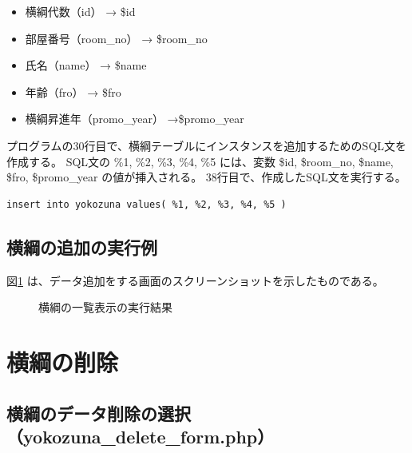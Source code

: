 \documentclass[10pt,a4paper,titlepage]{jreport}
\begin{document}


\begin{itemize}
\item 横綱代数（id） → \$id
\item 部屋番号（room\_no） → \$room\_no
\item 氏名（name） → \$name
\item 年齢（fro） → \$fro
\item 横綱昇進年（promo\_year） →\$promo\_year
\end{itemize}

プログラムの30行目で、横綱テーブルにインスタンスを追加するためのSQL文を作成する。
SQL文の \%1, \%2, \%3, \%4, \%5 には、変数 \$id, \$room\_no, \$name, \$fro, \$promo\_year の値が挿入される。
38行目で、作成したSQL文を実行する。\\

\begin{lstlisting}[caption=横綱の追加のためのSQL]
insert into yokozuna values( %1, %2, %3, %4, %5 )
\end{lstlisting}
\vspace{3mm}


\subsection{横綱の追加の実行例}

図\ref{fig:example_list2} は、データ追加をする画面のスクリーンショットを示したものである。

\begin{figure}[h]
	\begin{center}
	\end{center}
	\caption{横綱の一覧表示の実行結果
	}
	\label{fig:example_list2}
\end{figure}


\section{横綱の削除}


\subsection{横綱のデータ削除の選択（yokozuna\_delete\_form.php）}
\end{document}
